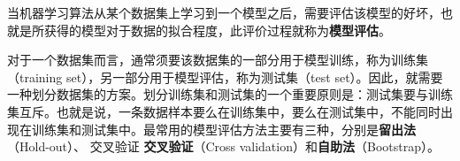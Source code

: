 
\begin{issues}
\issueDraft
\end{issues}


当机器学习算法从某个数据集上学习到一个模型之后，需要评估该模型的好坏，也就是所获得的模型对于数据的拟合程度，此评价过程就称为\textbf{模型评估}。

对于一个数据集而言，通常须要该数据集的一部分用于模型训练，称为训练集（training set），另一部分用于模型评估，称为测试集（test set）。因此，就需要一种划分数据集的方案。划分训练集和测试集的一个重要原则是：测试集要与训练集互斥。也就是说，一条数据样本要么在训练集中，要么在测试集中，不能同时出现在训练集和测试集中。最常用的模型评估方法主要有三种，分别是\textbf{留出法}（Hold-out）、 交叉验证 \textbf{交叉验证}（Cross validation）和\textbf{自助法}（Bootstrap）。